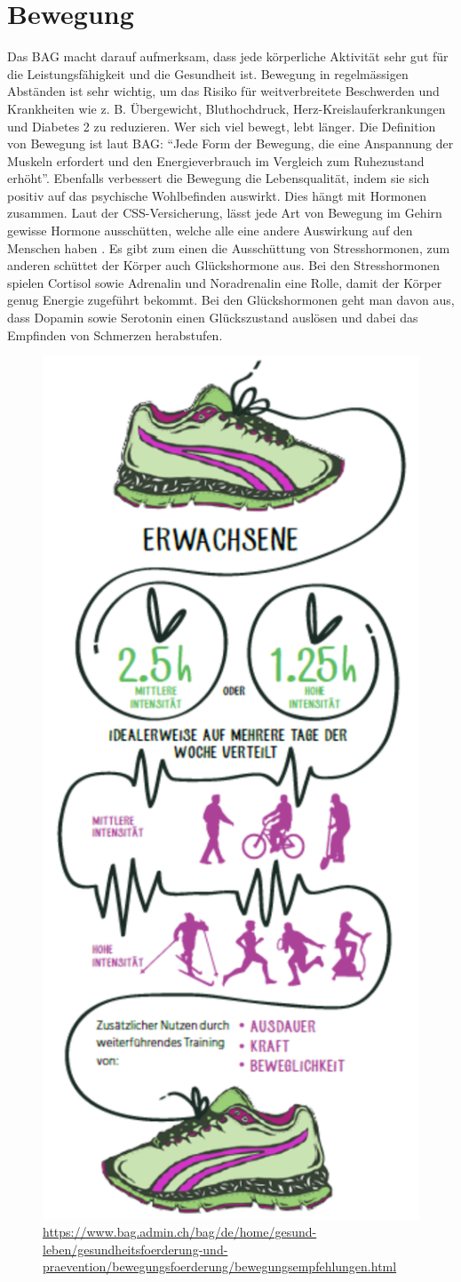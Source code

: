 \section{Bewegung}
\authortoc{\bastian}{\sectionident}
Das BAG macht darauf aufmerksam, dass jede körperliche Aktivität sehr gut für die Leistungsfähigkeit und die Gesundheit ist. Bewegung in regelmässigen Abständen ist sehr wichtig, um das Risiko für weitverbreitete Beschwerden und Krankheiten wie z. B. Übergewicht, Bluthochdruck, Herz-Kreislauferkrankungen und Diabetes 2 zu reduzieren.
\newline
Wer sich viel bewegt, lebt länger. Die Definition von Bewegung ist laut BAG: “Jede Form der Bewegung, die eine Anspannung der Muskeln erfordert und den Energieverbrauch im Vergleich zum Ruhezustand erhöht”.
\newline
Ebenfalls verbessert die Bewegung die Lebensqualität, indem sie sich positiv auf das psychische Wohlbefinden auswirkt. Dies hängt mit Hormonen zusammen. Laut der CSS-Versicherung, lässt jede Art von Bewegung im Gehirn gewisse Hormone ausschütten, welche alle eine andere Auswirkung auf den Menschen haben \cite{hormone-bei-bewegung}. Es gibt zum einen die Ausschüttung von Stresshormonen, zum anderen schüttet der Körper auch Glückshormone aus. Bei den Stresshormonen spielen Cortisol sowie Adrenalin und Noradrenalin eine Rolle, damit der Körper genug Energie zugeführt bekommt. Bei den Glückshormonen geht man davon aus, dass Dopamin sowie Serotonin einen Glückszustand auslösen und dabei das Empfinden von Schmerzen herabstufen.
\newline
\begin{figure}[!ht]
  \centering
  \includegraphics[width=0.38\linewidth]{./images/bewegungsempfehlungen-ew-dt.png}
  \caption{Grafik vom BAG zur Bewegungsempfehlung von Erwachsenen Menschen.}
  \label{fig:bewegungsempfehlungen}
  \caption*{\url{https://www.bag.admin.ch/bag/de/home/gesund-leben/gesundheitsfoerderung-und-praevention/bewegungsfoerderung/bewegungsempfehlungen.html}}
\end{figure}
